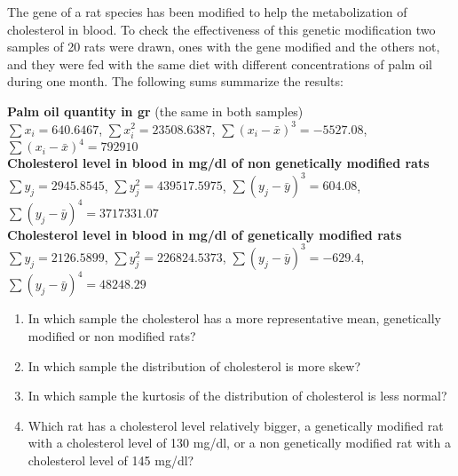 {The gene of a rat species has been modified to help the metabolization of cholesterol in blood.
To check the effectiveness of this genetic modification two samples of 20 rats were drawn, ones with the gene modified and the others not, and they were fed with the same diet with different concentrations of palm oil during one month. 
The following sums summarize the results:

\textbf{Palm oil quantity in gr} (the same in both samples)\\
\(\sum x_i=640.6467\), \(\sum x_i^2=23508.6387\),
\(\sum(x_i-\bar x)^3=-5527.08\), \(\sum(x_i-\bar x)^4=792910\)\\
\textbf{Cholesterol level in blood in mg/dl of non genetically modified rats}\\
\(\sum y_j=2945.8545\), \(\sum y_j^2=439517.5975\),
\(\sum(y_j-\bar y)^3=604.08\), \(\sum(y_j-\bar y)^4=3717331.07\)\\
\textbf{Cholesterol level in blood in mg/dl of genetically modified rats}\\
\(\sum y_j=2126.5899\), \(\sum y_j^2=226824.5373\),
\(\sum(y_j-\bar y)^3=-629.4\), \(\sum(y_j-\bar y)^4=48248.29\)\\

\begin{enumerate}
\item In which sample the cholesterol has a more representative mean, genetically modified or non modified rats?
\item In which sample the distribution of cholesterol is more skew?
\item In which sample the kurtosis of the distribution of cholesterol is less normal?
\item Which rat has a cholesterol level relatively bigger, a genetically modified rat with a cholesterol level of 130 mg/dl, or a non genetically modified rat with a cholesterol level of 145 mg/dl?
\end{enumerate}
}
